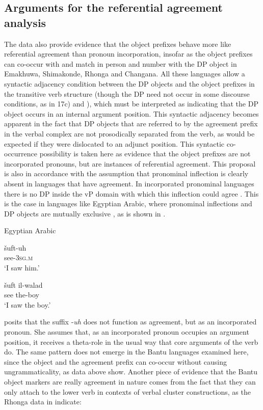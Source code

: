\documentclass[output=paper]{langsci/langscibook}
\begin{document}
\subsection{Arguments for the referential agreement analysis}

The data also provide evidence that the object prefixes behave more like referential agreement than pronoun incorporation, insofar as the object prefixes can co-occur with and match in person and number with the DP object in Emakhuwa, Shimakonde, Rhonga and Changana. All these languages allow a syntactic adjacency condition between the DP objects and the object prefixes in the transitive verb structure (though the DP need not occur in some discourse conditions, as in 17c) and ), which must be interpreted as indicating that the DP object occurs in an internal argument position. This syntactic adjacency becomes apparent in the fact that DP objects that are referred to by the agreement prefix in the verbal complex are not prosodically separated from the verb, as would be expected if they were dislocated to an adjunct position. This syntactic co-occurrence possibility is taken here as evidence that the object prefixes are not incorporated pronouns, but are instances of referential agreement. This proposal is also in accordance with the assumption that pronominal inflection is clearly absent in languages that have agreement. In incorporated pronominal languages there is no DP inside the vP domain with which this inflection could agree \citep{Jelinek1989}. This is the case in languages like Egyptian Arabic, where pronominal inflections and DP objects are mutually exclusive \citep{Jelinek1989}, as is shown in .

{Egyptian Arabic}

\ea
\gll šuft-uh\\
     see-\textsc{3sg.m}\\
\glt ‘I saw him.’
\z

\ea
\gll šuft           il-walad\\
     see           the-boy\\
\glt ‘I saw the boy.’
\z

\citet{Jelinek1989} posits that the suffix -{\textit{uh}} does not function as agreement, but as an incorporated pronoun. She assumes that, as an incorporated pronoun occupies an argument position, it receives {a theta}{}-role in the usual way that core arguments of the verb do. The same pattern does not emerge in the Bantu languages examined here, since the object and the agreement prefix can co-occur without causing ungrammaticality, as data above show. Another piece of evidence that the Bantu object markers are really agreement in nature comes from the fact that they can only attach to the lower verb in contexts of verbal cluster constructions, as the Rhonga data in  indicate:
\end{document}
